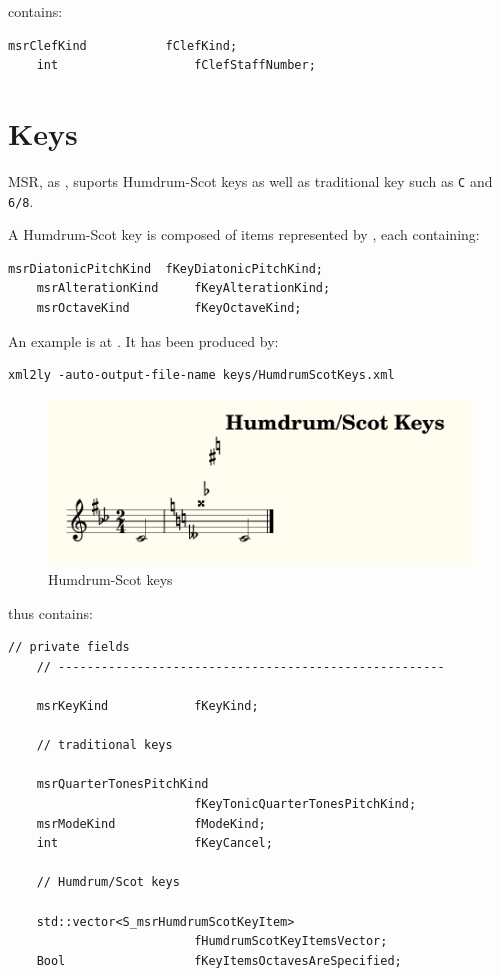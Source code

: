  contains:
\begin{lstlisting}[language=CPlusPlus]
    msrClefKind           fClefKind;
    int                   fClefStaffNumber;
\end{lstlisting}


\section{Keys}\label{Keys}

MSR, as \mxml, suports Humdrum-Scot keys as well as traditional key such as {\tt C} and {\tt 6/8}.

A Humdrum-Scot key is composed of items represented by , each containing:
\begin{lstlisting}[language=CPlusPlus]
    msrDiatonicPitchKind  fKeyDiatonicPitchKind;
    msrAlterationKind     fKeyAlterationKind;
    msrOctaveKind         fKeyOctaveKind;
\end{lstlisting}

An example is at . It has been produced by:
\begin{lstlisting}[language=Terminal]
xml2ly -auto-output-file-name keys/HumdrumScotKeys.xml
\end{lstlisting}

\begin{figure}[htbp]
\begin{center}
\includegraphics{../graphics/HumdrumScotKeys.png}

\caption{Humdrum-Scot keys}
\label{Humdrum-Scot keys}
\end{center}
\end{figure}

 thus contains:
\begin{lstlisting}[language=CPlusPlus]
    // private fields
    // ------------------------------------------------------

    msrKeyKind            fKeyKind;

    // traditional keys

    msrQuarterTonesPitchKind
                          fKeyTonicQuarterTonesPitchKind;
    msrModeKind           fModeKind;
    int                   fKeyCancel;

    // Humdrum/Scot keys

    std::vector<S_msrHumdrumScotKeyItem>
                          fHumdrumScotKeyItemsVector;
    Bool                  fKeyItemsOctavesAreSpecified;
\end{lstlisting}


